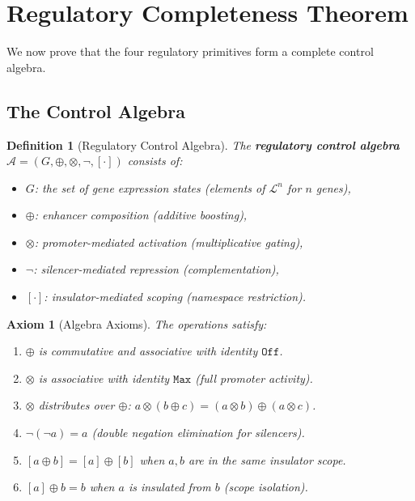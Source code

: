 \documentclass[12pt,a4paper]{article}
\newtheorem{definition}[theorem]{Definition}
\newtheorem{axiom}[theorem]{Axiom}
\begin{document}
\section{Regulatory Completeness Theorem}\label{sec:completeness}

We now prove that the four regulatory primitives form a complete control algebra.

\subsection{The Control Algebra}

\begin{definition}[Regulatory Control Algebra]\label{def:control-algebra}
The \textbf{regulatory control algebra} $\mathcal{A} = (G, \oplus, \otimes, \neg, [\cdot])$ consists of:
\begin{itemize}
  \item $G$: the set of gene expression states (elements of $\mathcal{L}^n$ for $n$ genes),
  \item $\oplus$: enhancer composition (additive boosting),
  \item $\otimes$: promoter-mediated activation (multiplicative gating),
  \item $\neg$: silencer-mediated repression (complementation),
  \item $[\cdot]$: insulator-mediated scoping (namespace restriction).
\end{itemize}
\end{definition}

\begin{axiom}[Algebra Axioms]\label{ax:algebra}
The operations satisfy:
\begin{enumerate}
  \item $\oplus$ is commutative and associative with identity $\texttt{Off}$.
  \item $\otimes$ is associative with identity $\texttt{Max}$ (full promoter activity).
  \item $\otimes$ distributes over $\oplus$: $a \otimes (b \oplus c) = (a \otimes b) \oplus (a \otimes c)$.
  \item $\neg(\neg a) = a$ (double negation elimination for silencers).
  \item $[a \oplus b] = [a] \oplus [b]$ when $a, b$ are in the same insulator scope.
  \item $[a] \oplus b = b$ when $a$ is insulated from $b$ (scope isolation).
\end{enumerate}
\end{axiom}
\end{document}
